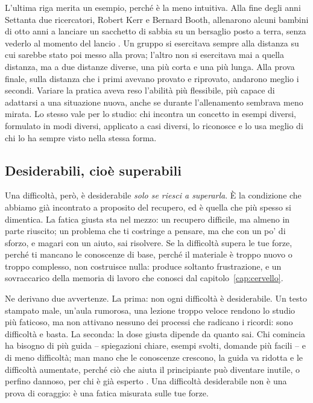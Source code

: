 L'ultima riga merita un esempio, perché è la meno intuitiva. Alla fine
degli anni Settanta due ricercatori, Robert Kerr e Bernard
Booth, allenarono alcuni bambini di otto anni a lanciare un sacchetto
di sabbia su un bersaglio posto a terra, senza vederlo al momento del
lancio \parencite{kerr1978}. Un gruppo si esercitava sempre alla
distanza su cui sarebbe stato poi messo alla prova; l'altro non si
esercitava mai a quella distanza, ma a due distanze diverse, una più
corta e una più lunga. Alla prova finale, sulla distanza che i primi
avevano provato e riprovato, andarono meglio i secondi. Variare la
pratica aveva reso l'abilità più flessibile, più capace di adattarsi a
una situazione nuova, anche se durante l'allenamento sembrava meno
mirata. Lo stesso vale per lo studio: chi incontra un concetto in
esempi diversi, formulato in modi diversi, applicato a casi diversi,
lo riconosce e lo usa meglio di chi lo ha sempre visto nella stessa
forma.

\subsection*{Desiderabili, cioè superabili}

Una difficoltà, però, è desiderabile \emph{solo se riesci a superarla}.
È la condizione che abbiamo già incontrato a proposito del recupero, ed
è quella che più spesso si dimentica. La fatica giusta sta nel mezzo:
un recupero difficile, ma almeno in parte riuscito; un problema che ti
costringe a pensare, ma che con un po' di sforzo, e magari con un aiuto,
sai risolvere. Se la difficoltà supera le tue forze, perché ti mancano
le conoscenze di base, perché il materiale è troppo nuovo o troppo
complesso, non costruisce nulla: produce soltanto frustrazione, e un
sovraccarico della memoria di lavoro che conosci dal
capitolo~\ref{cap:cervello}.

Ne derivano due avvertenze. La prima: non ogni difficoltà è
desiderabile. Un testo stampato male, un'aula rumorosa, una lezione
troppo veloce rendono lo studio più faticoso, ma non attivano nessuno
dei processi che radicano i ricordi: sono difficoltà e basta. La
seconda: la dose giusta dipende da quanto sai. Chi comincia ha bisogno
di più guida -- spiegazioni chiare, esempi svolti, domande più facili
-- e di meno difficoltà; man mano che le conoscenze crescono, la guida
va ridotta e le difficoltà aumentate, perché ciò che aiuta il
principiante può diventare inutile, o perfino dannoso, per chi è già
esperto \parencite{kalyuga2003}. Una difficoltà desiderabile non è una
prova di coraggio: è una fatica misurata sulle tue forze.

